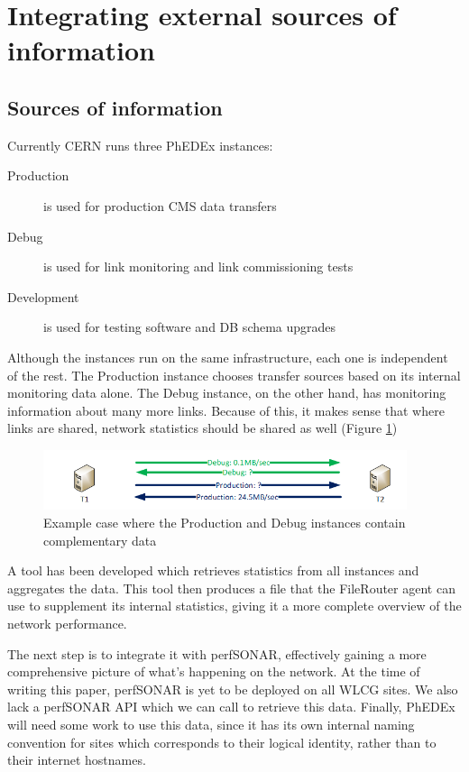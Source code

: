\section{Integrating external sources of information}

\subsection{Sources of information}

Currently CERN runs three PhEDEx instances:

\begin{description}
	\item[Production] is used for production CMS data transfers
	\item[Debug] is used for link monitoring and link commissioning tests
	\item[Development] is used for testing software and DB schema upgrades
\end{description}

Although the instances run on the same infrastructure, each one is independent 
of the rest. The Production instance chooses transfer sources based on its 
internal monitoring data alone. The Debug instance, on the other hand,
has monitoring information about many more links. Because of this, it makes
sense that where links are shared, network statistics should be shared
as well (Figure \ref{fig:Prod-vs-Debug})

\begin{figure}[h]
  \centering
  \includegraphics[width=0.95\textwidth]{Figures/Debug-vs-Prod-instance.png}
  \caption{Example case where the Production and Debug instances contain complementary
  data}
  \label{fig:Prod-vs-Debug}
\end{figure} 

A tool has been developed which retrieves statistics from all instances and 
aggregates the data. This tool then produces a file that the FileRouter agent
can use to supplement its internal statistics, giving it a more complete overview of the
network performance.

The next step is to integrate it with perfSONAR\cite{perfSONAR}, effectively gaining a 
more comprehensive picture of what's happening on the network. At the time of
writing this paper, perfSONAR is yet to be deployed on all WLCG sites. We also
lack a perfSONAR API which we can call to retrieve this data. Finally, PhEDEx will need
some work to use this data, since it has its own internal naming convention for sites which corresponds to their logical identity, rather than to their internet hostnames.
